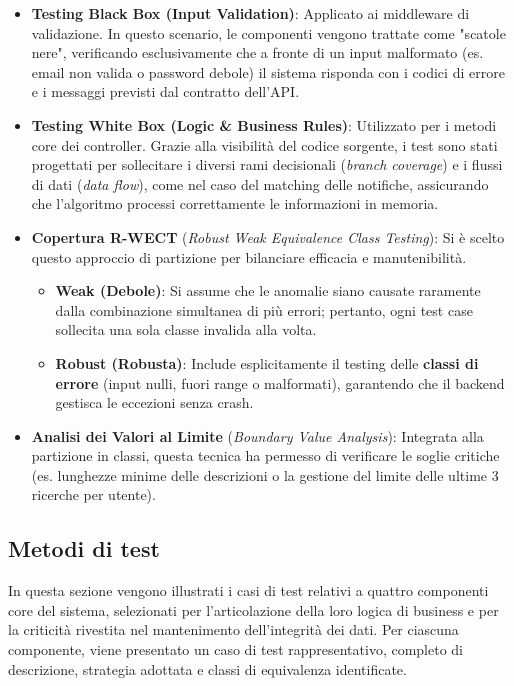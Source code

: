 \documentclass{article}
\begin{document}
\begin{itemize}
    \item \textbf{Testing Black Box (Input Validation)}: Applicato ai middleware di validazione. In questo scenario, le componenti vengono trattate come "scatole nere", verificando esclusivamente che a fronte di un input malformato (es. email non valida o password debole) il sistema risponda con i codici di errore e i messaggi previsti dal contratto dell'API.

    \item \textbf{Testing White Box (Logic \& Business Rules)}: Utilizzato per i metodi core dei controller. Grazie alla visibilità del codice sorgente, i test sono stati progettati per sollecitare i diversi rami decisionali (\textit{branch coverage}) e i flussi di dati (\textit{data flow}), come nel caso del matching delle notifiche, assicurando che l'algoritmo processi correttamente le informazioni in memoria.

    \item \textbf{Copertura R-WECT} (\textit{Robust Weak Equivalence Class Testing}): Si è scelto questo approccio di partizione per bilanciare efficacia e manutenibilità.
          \begin{itemize}
              \item \textbf{Weak (Debole)}: Si assume che le anomalie siano causate raramente dalla combinazione simultanea di più errori; pertanto, ogni test case sollecita una sola classe invalida alla volta.
              \item \textbf{Robust (Robusta)}: Include esplicitamente il testing delle \textbf{classi di errore} (input nulli, fuori range o malformati), garantendo che il backend gestisca le eccezioni senza crash.
          \end{itemize}

    \item \textbf{Analisi dei Valori al Limite} (\textit{Boundary Value Analysis}): Integrata alla partizione in classi, questa tecnica ha permesso di verificare le soglie critiche (es. lunghezze minime delle descrizioni o la gestione del limite delle ultime 3 ricerche per utente).
\end{itemize}

\newpage
\subsection{Metodi di test}
In questa sezione vengono illustrati i casi di test relativi a quattro componenti core del sistema, selezionati per l'articolazione della loro logica di business e per la criticità rivestita nel mantenimento dell'integrità dei dati. Per ciascuna componente, viene presentato un caso di test rappresentativo, completo di descrizione, strategia adottata e classi di equivalenza identificate.
\end{document}
